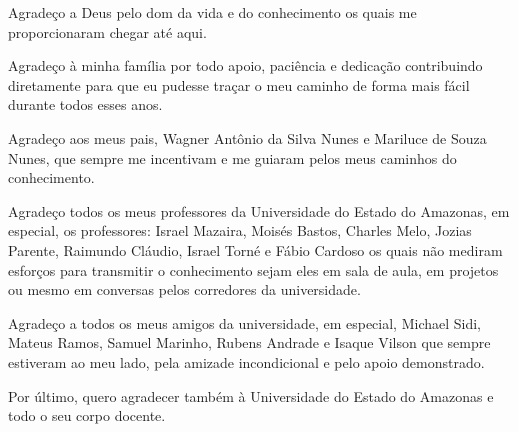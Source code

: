 
\begin{agradecimentos}[AGRADECIMENTOS]

Agradeço a Deus pelo dom da vida e do conhecimento os quais me proporcionaram chegar até aqui.

Agradeço à minha família por todo apoio, paciência e dedicação contribuindo diretamente para que eu pudesse traçar o meu caminho de forma mais fácil durante todos esses anos.

Agradeço aos meus pais, Wagner Antônio da Silva Nunes e Mariluce de Souza Nunes, que sempre me incentivam e me guiaram pelos meus caminhos do conhecimento.

Agradeço todos os meus professores da Universidade do Estado do Amazonas, em especial, os professores: Israel Mazaira, Moisés Bastos, Charles Melo, Jozias Parente, Raimundo Cláudio, Israel Torné e Fábio Cardoso os quais não mediram esforços para transmitir o conhecimento sejam eles em sala de aula, em projetos ou mesmo em conversas pelos corredores da universidade.

Agradeço a todos os meus amigos da universidade, em especial, Michael Sidi, Mateus Ramos, Samuel Marinho, Rubens Andrade e Isaque Vilson que sempre estiveram ao meu lado, pela amizade incondicional e pelo apoio demonstrado.

Por último, quero agradecer também à Universidade do Estado do Amazonas e todo o seu corpo docente.


\end{agradecimentos}
